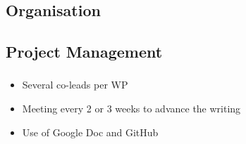 \subsection{Organisation}

\subsection{Project Management}
\begin{frame}
  \frametitle{\insertsectionhead}
  \framesubtitle{\insertsubsectionhead}

  \begin{itemize}
    \item Several co-leads per WP 
    \item Meeting every 2 or 3 weeks to advance the writing
    \item Use of Google Doc and GitHub
  \end{itemize}

\end{frame}


